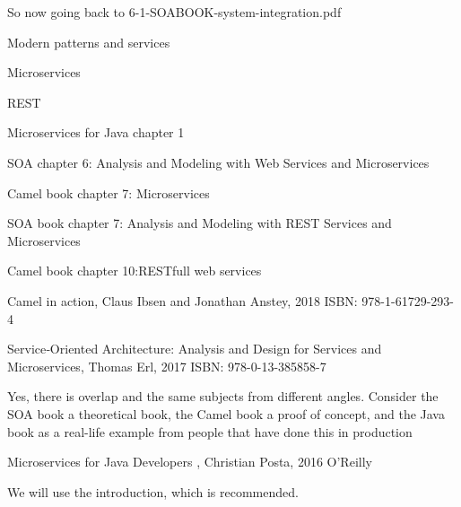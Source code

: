 \documentclass[Screen16to9,17pt]{foils}
\begin{document}
So now going back to 6-1-SOABOOK-system-integration.pdf



\begin{list2}
\item Modern patterns and services
\item Microservices
\item REST
\end{list2}





\begin{list1}
\item Microservices for Java chapter 1
\item SOA chapter 6: Analysis and Modeling with Web Services and Microservices
\item Camel book chapter 7: Microservices
\vskip 1cm
\item SOA book chapter 7: Analysis and Modeling with REST Services and Microservices
\item Camel book chapter 10:RESTfull web services
\end{list1}

Camel in action, Claus Ibsen and Jonathan Anstey, 2018
ISBN: 978-1-61729-293-4

Service‑Oriented Architecture: Analysis and Design for Services and Microservices, Thomas Erl, 2017
ISBN: 978-0-13-385858-7

Yes, there is overlap and the same subjects from different angles. Consider the SOA book a theoretical book, the Camel book a proof of concept, and the Java book as a real-life example from people that have done this in production



Microservices for Java Developers , Christian Posta, 2016 O’Reilly\\

We will use the introduction, which is recommended.

\end{document}
